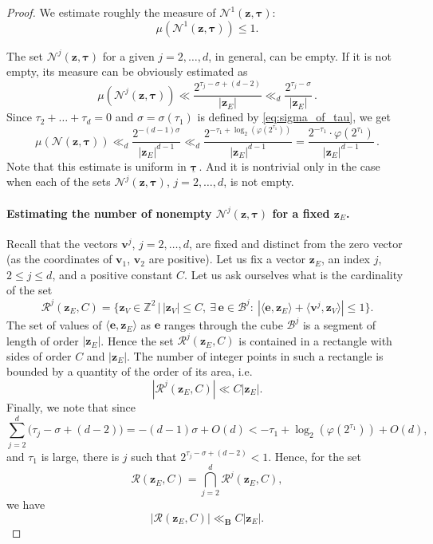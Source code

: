 \documentclass[a4paper,12pt]{article}
\theoremstyle{definition}
\theoremstyle{remark}
\theoremstyle{plain}
\renewcommand{\vec}[1]{\mathbf{#1}}
\renewcommand{\leq}{\leqslant}
\newcommand{\Z}{\mathbb{Z}}
\newcommand{\cB}{\mathcal{B}}
\newcommand{\cN}{\mathcal{N}}
\newcommand{\cR}{\mathcal{R}}
\newcommand{\bB}{\mathbf{B}}
\begin{document}
\begin{proof}
  We estimate roughly the measure of $\cN^1(\vec z,\pmb\tau)$:
  \[
    \mu(\cN^1(\vec z,\pmb\tau))\leq1.
  \]
  
  The set $\cN^j(\vec z,\pmb\tau)$ for a given $j=2,\ldots,d$, in general, can be empty. If it is not empty, its measure can be obviously estimated as
  \[
    \mu(\cN^j(\vec z,\pmb\tau))\ll
    \frac{2^{\tau_j-\sigma+(d-2)}}{|\vec z_E|}\ll_d
    \frac{2^{\tau_j-\sigma}}{|\vec z_E|}\,.
  \]
  Since $\tau_2+\ldots+\tau_d=0$ and $\sigma=\sigma(\tau_1)$ is defined by \eqref{eq:sigma_of_tau}, we get
  \begin{equation}\label{eq:estimating_measure_of_N}
    \mu(\cN(\vec z,\pmb\tau))\ll_d
    \frac{2^{-(d-1)\sigma}}{|\vec z_E|^{d-1}}\ll_d
    \frac{2^{-\tau_1+\log_2(\varphi(2^{\tau_1}))}}{|\vec z_E|^{d-1}}=
    \frac{2^{-\tau_1}\cdot\varphi(2^{\tau_1})}{|\vec z_E|^{d-1}}\,.
  \end{equation}
  Note that this estimate is uniform in $\underline{\pmb\tau}$\,. And it is nontrivial only in the case when each of the sets $\cN^j(\vec z,\pmb\tau)$, $j=2,\ldots,d$, is not empty.
  
  \paragraph{Estimating the number of nonempty $\cN^j(\vec z,\pmb\tau)$ for a fixed $\vec z_E$.}
  
  Recall that the vectors $\vec v^j$, $j=2,\ldots,d$, are fixed and distinct from the zero vector (as the coordinates of $\vec v_1$, $\vec v_2$ are positive). Let us fix a vector $\vec z_E$, an index $j$, $2\leq j\leq d$, and a positive constant $C$. Let us ask ourselves what is the cardinality of the set
  \[
    \cR^j(\vec z_E,C)=
    \Big\{\vec z_V\in\Z^2 \,\Big|\, |\vec z_V|\leq C,\ \exists\,\vec e\in\cB^j:\ |\langle\vec e,\vec z_E\rangle+\langle\vec v^j,\vec z_V\rangle|\leq1 \Big\}.
  \]
  The set of values of $\langle\vec e,\vec z_E\rangle$ as $\vec e$ ranges through the cube $\cB^j$ is a segment of length of order $|\vec z_E|$. Hence the set $\cR^j(\vec z_E,C)$ is contained in a rectangle with sides of order $C$ and $|\vec z_E|$. The number of integer points in such a rectangle is bounded by a quantity of the order of its area, i.e.
  \[
    |\cR^j(\vec z_E,C)|\ll C|\vec z_E|.
  \]
  Finally, we note that since
  \[
    \sum_{j=2}^{d}\big(\tau_j-\sigma+(d-2)\big)=-(d-1)\sigma+O(d)<-\tau_1+\log_2(\varphi(2^{\tau_1}))+O(d),
  \]
  and $\tau_1$ is large, there is $j$ such that $2^{\tau_j-\sigma+(d-2)}<1$. Hence, for the set
  \[
    \cR(\vec z_E,C)=
    \bigcap_{j=2}^d\cR^j(\vec z_E,C),
  \]
  we have
  \begin{equation}\label{eq:estimate_on_R}
    |\cR(\vec z_E,C)|\ll_\bB C|\vec z_E|.
  \end{equation}
  

\end{proof}
\end{document}
